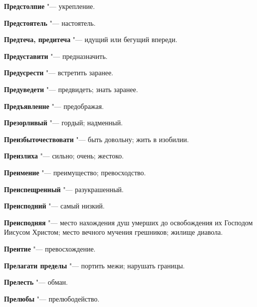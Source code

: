 \begin{mymulticols}{2}
\noindent\textbf{Предстолпие} "--- укрепление. 




\noindent\textbf{Предстоятель} "--- настоятель. 




\noindent\textbf{Предтеча, предитеча} "--- идущий или бегущий впереди. 




\noindent\textbf{Предуставити} "--- предназначить. 




\noindent\textbf{Предусрести} "--- встретить заранее. 




\noindent\textbf{Предуведети} "--- предвидеть; знать заранее. 




\noindent\textbf{Предъявленне} "--- предображая. 




\noindent\textbf{Презорливый} "--- гордый; надменный. 




\noindent\textbf{Преизбыточествовати} "--- быть довольну; жить в изобилии. 




\noindent\textbf{Преизлиха} "--- сильно; очень; жестоко. 




\noindent\textbf{Преимение} "--- преимущество; превосходство. 




\noindent\textbf{Преиспещренный} "--- разукрашенный. 




\noindent\textbf{Преисподний} "--- самый низкий. 




\noindent\textbf{Преисподняя} "--- место нахождения душ умерших до освобождения их Господом Иисусом Христом; место вечного мучения грешников; жилище диавола. 




\noindent\textbf{Преитие} "--- превосхождение. 




\noindent\textbf{Прелагати пределы} "--- портить межи; нарушать границы. 




\noindent\textbf{Прелесть} "--- обман. 




\noindent\textbf{Прелюбы} "--- прелюбодейство. 





\end{mymulticols}
